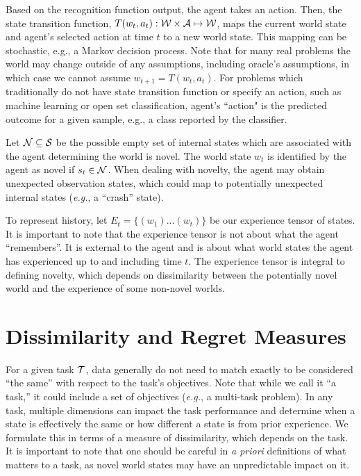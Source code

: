 Based on the recognition function output, the agent takes an action. Then, the state transition function,
$T(w_t,a_t):{\cal W} \times {\cal A} \mapsto \cal W$, maps the current world state and agent's selected action at time $t$ to a new world state. 
This mapping can be stochastic, e.g., a Markov decision process.
Note that for many real problems the world may change outside of any assumptions, including oracle's assumptions, in which case we cannot assume $w_{t+1} = T(w_t,a_t)$.
For problems which traditionally do not have state transition function
or specify an action, such as machine learning or open set classification, agent's ``action" is the predicted outcome for a given sample, e.g., a class reported by the classifier. 


Let $\cal N\subseteq \cal S$ be the possible empty set of internal states which are associated with the agent determining the world is novel. The world state $w_t$ is identified by the agent as novel if 
$s_t \in {\cal N}$.  When dealing with novelty, the agent may obtain unexpected observation states, which could map to potentially unexpected internal states (\textit{e.g.}, a ``crash'' state). 



To represent history, let $E_{t} = \{(w_1) \ldots (w_t)\}$ be our experience tensor of states. 
It is important to note that the experience tensor is not about what the agent ``remembers''.
 It is external to the agent and is about what world states the agent has experienced up to and including time $t$. 
The experience tensor is integral to defining novelty, which depends on dissimilarity between the potentially novel world and the experience of some non-novel worlds.




\section{Dissimilarity and Regret Measures}
For a given task ${\cal T}$, data generally do not need to match exactly to be considered ``the same'' with respect to the task's objectives.  Note that while we call it ``a task,'' it could include a set of objectives (\textit{e.g.}, a multi-task problem). In any task, multiple dimensions can impact the task performance and determine when a state is effectively the same or how different a state is from prior experience.  We formulate this in terms of a measure of dissimilarity, which depends on the task. It is important to note that one should be careful in {\em a priori} definitions of what matters to a task, as novel world states may have an unpredictable impact on it. 

